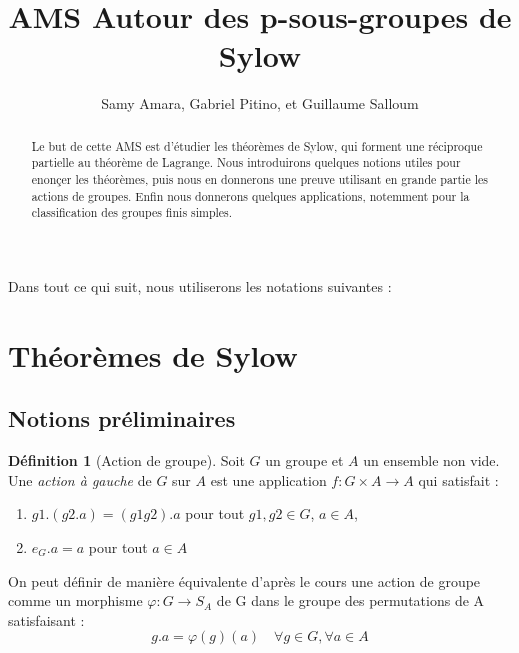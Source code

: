 \documentclass{article}
\title{AMS Autour des p-sous-groupes de Sylow}
\author{Samy Amara, Gabriel Pitino, et Guillaume Salloum}
\date{}
\theoremstyle{definition}
\newtheorem{definition}[subsubsection]{Définition}
\theoremstyle{plain}
\theoremstyle{plain}
\theoremstyle{plain}
\theoremstyle{plain}
\theoremstyle{definition}
\theoremstyle{plain}
\theoremstyle{plain}
\begin{document}
\maketitle

\begin{abstract}
	Le but de cette AMS est d'étudier les théorèmes de Sylow, qui forment une réciproque partielle au théorème de Lagrange.
	Nous introduirons quelques notions utiles pour enonçer les théorèmes, puis nous en donnerons une preuve utilisant en grande partie les actions de groupes.
	Enfin nous donnerons quelques applications, notemment pour la classification des groupes finis simples.%
\end{abstract}



\tableofcontents
\clearpage

Dans tout ce qui suit, nous utiliserons les notations suivantes :
\glsaddall
\renewcommand*{\arraystretch}{1.2} %
\printnoidxglossary[title=Notations,type=symbols,style=long,sort=standard,nonumberlist]

\clearpage

\section{Théorèmes de Sylow}
\subsection{Notions préliminaires}


\begin{definition}[Action de groupe]
	Soit \( G \) un groupe et \( A \) un ensemble non vide. Une \textit{action à gauche} de \( G \) sur \( A \) est une application \( f : G \times A \rightarrow A\) qui satisfait :
	\begin{enumerate}[label = (\roman*)]
		\item \(g1.(g2.a) = (g1g2).a \) pour tout \(g1,g2 \in G\), \(a \in A\),
		\item \(e_G.a = a\) pour tout \(a \in A\)
	\end{enumerate}

	On peut définir de manière équivalente d'après le cours une action de groupe comme un morphisme \( \varphi : G \rightarrow S_{A} \) de G dans le groupe des permutations de A satisfaisant :
	\begin{equation}
		g.a = \varphi(g)(a) \quad \forall g \in G, \forall a \in A
	\end{equation}
\end{definition}
\end{document}
